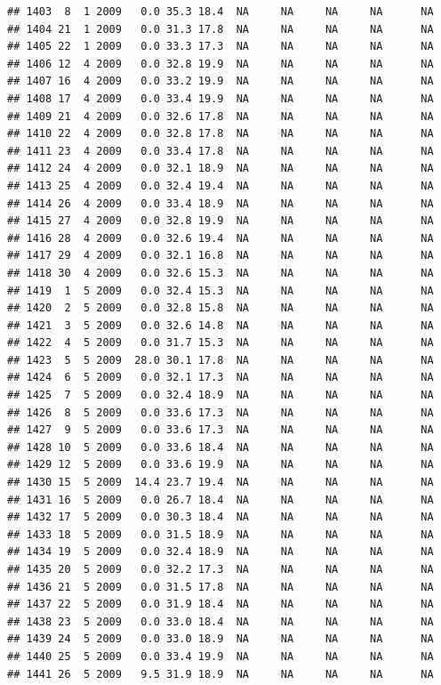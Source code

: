\documentclass[
]{book}
\begin{document}
\begin{verbatim}
## 1403  8  1 2009   0.0 35.3 18.4  NA     NA     NA     NA      NA
## 1404 21  1 2009   0.0 31.3 17.8  NA     NA     NA     NA      NA
## 1405 22  1 2009   0.0 33.3 17.3  NA     NA     NA     NA      NA
## 1406 12  4 2009   0.0 32.8 19.9  NA     NA     NA     NA      NA
## 1407 16  4 2009   0.0 33.2 19.9  NA     NA     NA     NA      NA
## 1408 17  4 2009   0.0 33.4 19.9  NA     NA     NA     NA      NA
## 1409 21  4 2009   0.0 32.6 17.8  NA     NA     NA     NA      NA
## 1410 22  4 2009   0.0 32.8 17.8  NA     NA     NA     NA      NA
## 1411 23  4 2009   0.0 33.4 17.8  NA     NA     NA     NA      NA
## 1412 24  4 2009   0.0 32.1 18.9  NA     NA     NA     NA      NA
## 1413 25  4 2009   0.0 32.4 19.4  NA     NA     NA     NA      NA
## 1414 26  4 2009   0.0 33.4 18.9  NA     NA     NA     NA      NA
## 1415 27  4 2009   0.0 32.8 19.9  NA     NA     NA     NA      NA
## 1416 28  4 2009   0.0 32.6 19.4  NA     NA     NA     NA      NA
## 1417 29  4 2009   0.0 32.1 16.8  NA     NA     NA     NA      NA
## 1418 30  4 2009   0.0 32.6 15.3  NA     NA     NA     NA      NA
## 1419  1  5 2009   0.0 32.4 15.3  NA     NA     NA     NA      NA
## 1420  2  5 2009   0.0 32.8 15.8  NA     NA     NA     NA      NA
## 1421  3  5 2009   0.0 32.6 14.8  NA     NA     NA     NA      NA
## 1422  4  5 2009   0.0 31.7 15.3  NA     NA     NA     NA      NA
## 1423  5  5 2009  28.0 30.1 17.8  NA     NA     NA     NA      NA
## 1424  6  5 2009   0.0 32.1 17.3  NA     NA     NA     NA      NA
## 1425  7  5 2009   0.0 32.4 18.9  NA     NA     NA     NA      NA
## 1426  8  5 2009   0.0 33.6 17.3  NA     NA     NA     NA      NA
## 1427  9  5 2009   0.0 33.6 17.3  NA     NA     NA     NA      NA
## 1428 10  5 2009   0.0 33.6 18.4  NA     NA     NA     NA      NA
## 1429 12  5 2009   0.0 33.6 19.9  NA     NA     NA     NA      NA
## 1430 15  5 2009  14.4 23.7 19.4  NA     NA     NA     NA      NA
## 1431 16  5 2009   0.0 26.7 18.4  NA     NA     NA     NA      NA
## 1432 17  5 2009   0.0 30.3 18.4  NA     NA     NA     NA      NA
## 1433 18  5 2009   0.0 31.5 18.9  NA     NA     NA     NA      NA
## 1434 19  5 2009   0.0 32.4 18.9  NA     NA     NA     NA      NA
## 1435 20  5 2009   0.0 32.2 17.3  NA     NA     NA     NA      NA
## 1436 21  5 2009   0.0 31.5 17.8  NA     NA     NA     NA      NA
## 1437 22  5 2009   0.0 31.9 18.4  NA     NA     NA     NA      NA
## 1438 23  5 2009   0.0 33.0 18.4  NA     NA     NA     NA      NA
## 1439 24  5 2009   0.0 33.0 18.9  NA     NA     NA     NA      NA
## 1440 25  5 2009   0.0 33.4 19.9  NA     NA     NA     NA      NA
## 1441 26  5 2009   9.5 31.9 18.9  NA     NA     NA     NA      NA

\end{verbatim}
\end{document}
